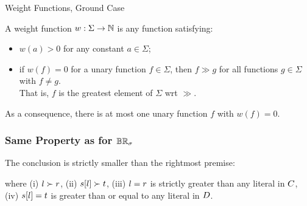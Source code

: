 \begin{frame}{Weight Functions, Ground Case}

    A \alert{weight function} ${w: \Sigma \rightarrow \mathbb{N}}$
    is any function satisfying:

    \begin{itemize}
    \item $w(a)>0$ for any constant $a\in\Sigma$;\\[.5em]
      
    \item if $w(f)=0$ for a unary function $f\in\Sigma$, then $f\gg g$
      for all functions $g\in\Sigma$ with $f\neq g$.\\

      That is, $f$ is the greatest element of $\Sigma$ wrt $\gg$.
      
     \end{itemize}

     \bigskip
As a consequence, there is at most one unary function $f$ with
$w(f)=0$.


\end{frame}


%

      \begin{frame}\frametitle{Same Property as for $\mathbb{BR}_{\sigma}$}

The conclusion is \alert{strictly smaller} than the rightmost premise:

where (i) ${l \succ r}$, (ii) ${s[l] \succ t}$, (iii)
${{l = r}}$ is strictly greater than any literal in $ C$,
(iv) ${{s[l] = t}}$ is greater than or equal to
any literal in $ D$.


                               \end{frame}



